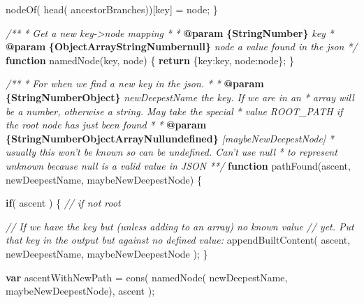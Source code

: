 \documentclass[]{article}
\newenvironment{Shaded}{}{}
\newcommand{\KeywordTok}[1]{\textcolor[rgb]{0.00,0.44,0.13}{\textbf{{#1}}}}
\newcommand{\DataTypeTok}[1]{\textcolor[rgb]{0.56,0.13,0.00}{{#1}}}
\newcommand{\CommentTok}[1]{\textcolor[rgb]{0.38,0.63,0.69}{\textit{{#1}}}}
\newcommand{\FunctionTok}[1]{\textcolor[rgb]{0.02,0.16,0.49}{{#1}}}
\newcommand{\NormalTok}[1]{{#1}}
\begin{document}
\begin{Shaded}
\begin{Highlighting}[]
      \FunctionTok{nodeOf}\NormalTok{( }\FunctionTok{head}\NormalTok{( ancestorBranches))[key] = node;}
   \NormalTok{\}}

   \CommentTok{/**}
\CommentTok{    * Get a new key->node mapping}
\CommentTok{    * }
\CommentTok{    * }\KeywordTok{@param}\CommentTok{ }\KeywordTok{\{String\textbar{}Number\}}\CommentTok{ key}
\CommentTok{    * }\KeywordTok{@param}\CommentTok{ }\KeywordTok{\{Object\textbar{}Array\textbar{}String\textbar{}Number\textbar{}null\}}\CommentTok{ node a value found in the json}
\CommentTok{    */}
   \KeywordTok{function} \FunctionTok{namedNode}\NormalTok{(key, node) \{}
      \KeywordTok{return} \NormalTok{\{}\DataTypeTok{key}\NormalTok{:key, }\DataTypeTok{node}\NormalTok{:node\};}
   \NormalTok{\}}
     
   \CommentTok{/**}
\CommentTok{    * For when we find a new key in the json.}
\CommentTok{    * }
\CommentTok{    * }\KeywordTok{@param}\CommentTok{ }\KeywordTok{\{String\textbar{}Number\textbar{}Object\}}\CommentTok{ newDeepestName the key. If we are in an }
\CommentTok{    *    array will be a number, otherwise a string. May take the special }
\CommentTok{    *    value ROOT_PATH if the root node has just been found}
\CommentTok{    *    }
\CommentTok{    * }\KeywordTok{@param}\CommentTok{ }\KeywordTok{\{String\textbar{}Number\textbar{}Object\textbar{}Array\textbar{}Null\textbar{}undefined\}}\CommentTok{ [maybeNewDeepestNode] }
\CommentTok{    *    usually this won't be known so can be undefined. Can't use null }
\CommentTok{    *    to represent unknown because null is a valid value in JSON}
\CommentTok{    **/}  
   \KeywordTok{function} \FunctionTok{pathFound}\NormalTok{(ascent, newDeepestName, maybeNewDeepestNode) \{}

      \KeywordTok{if}\NormalTok{( ascent ) \{ }\CommentTok{// if not root}
      
         \CommentTok{// If we have the key but (unless adding to an array) no known value}
         \CommentTok{// yet. Put that key in the output but against no defined value:      }
         \FunctionTok{appendBuiltContent}\NormalTok{( ascent, newDeepestName, maybeNewDeepestNode );}
      \NormalTok{\}}
   
      \KeywordTok{var} \NormalTok{ascentWithNewPath = }\FunctionTok{cons}\NormalTok{( }
                                 \FunctionTok{namedNode}\NormalTok{( newDeepestName, }
                                            \NormalTok{maybeNewDeepestNode), }
                                 \NormalTok{ascent}
                              \NormalTok{);}
     

\end{Highlighting}
\end{Shaded}
\end{document}
